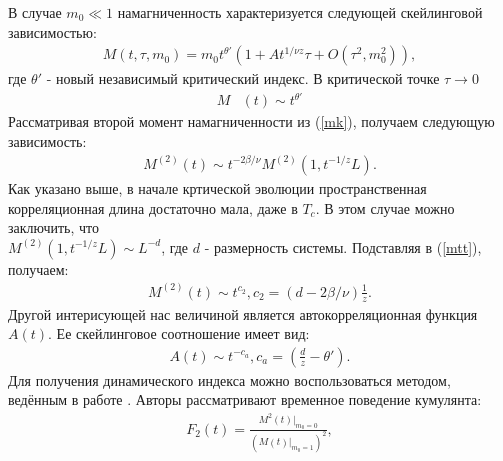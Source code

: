 \documentclass[12pt,a4paper]{article}
\begin{document}
В случае $m_0 \ll 1$ намагниченность характеризуется следующей скейлинговой зависимостью:
\begin{equation} \label{mnonupr}
\begin{split}
M \left( t, \tau, m_0 \right)= m_{0}t^{\theta'} \left(1 + At^{1/\nu z}\tau + O(\tau^2, m_{0}^{2}) \right),
\end{split}
\end{equation}
где $\theta'$ - новый независимый критический индекс. В критической точке $\tau \to 0$
\begin{equation} \label{mtheta}
\begin{split}
M &\left( t \right) \sim t^{\theta'}
\end{split}
\end{equation}
Рассматривая второй момент намагниченности из (\ref{mk}), получаем следующую зависимость:
\begin{equation} \label{mtt}
\begin{split}
M^{(2)} \left( t \right) \sim t^{-2\beta / \nu}M^{(2)} \left( 1, t^{-1/z}L \right).
\end{split}
\end{equation}
Как указано выше, в начале кртической эволюции пространственная корреляционная длина достаточно мала, даже в $T_c$. В этом случае можно заключить, что\\ $M^{(2)} \left( 1, t^{-1/z}L \right) \sim L^{-d}$, где $d$ - размерность системы. Подставляя в (\ref{mtt}), получаем:
\begin{equation} \label{mtt_scail}
\begin{split}
M^{(2)} \left( t \right) \sim t^{c_2}, c_2 = \left( d - 2\beta / \nu \right)\frac{1}{z}.
\end{split}
\end{equation}
Другой интерисующей нас величиной является автокорреляционная функция $A(t)$. Ее скейлинговое соотношение имеет вид:
\begin{equation} \label{at_scail}
\begin{split}
  A\left( t \right) \sim t^{-c_a}, c_a = \left( \frac{d}{z} - \theta' \right).
\end{split}
\end{equation}
Для получения динамического индекса можно воспользоваться методом, ведённым в работе \cite{lit:Alves}. Авторы рассматривают временное поведение кумулянта:
\begin{equation} \label{ftt}
\begin{split}
F_{2} \left( t \right) = \frac{ M^{2} \left( t \right) |_{m_{0}=0} }{ \left( M \left( t \right) |_{m_{0}=1} \right)^{2} },
\end{split}
\end{equation}
\end{document}
